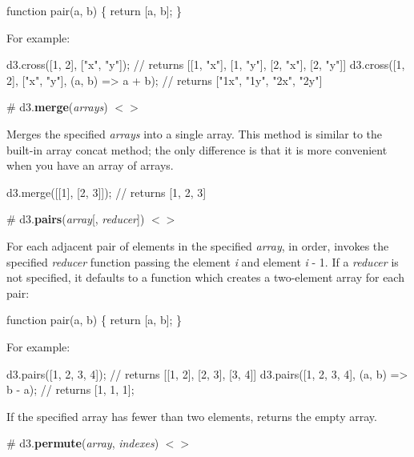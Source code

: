 \begin{DoxyCode}
function pair(a, b) \{
  return [a, b];
\}
\end{DoxyCode}


For example\+:


\begin{DoxyCode}
d3.cross([1, 2], ["x", "y"]); // returns [[1, "x"], [1, "y"], [2, "x"], [2, "y"]]
d3.cross([1, 2], ["x", "y"], (a, b) => a + b); // returns ["1x", "1y", "2x", "2y"]
\end{DoxyCode}


\label{_merge}%
\# d3.{\bfseries merge}({\itshape arrays}) \href{https://github.com/d3/d3-array/blob/master/src/merge.js}{\tt $<$$>$}

Merges the specified {\itshape arrays} into a single array. This method is similar to the built-\/in array concat method; the only difference is that it is more convenient when you have an array of arrays.


\begin{DoxyCode}
d3.merge([[1], [2, 3]]); // returns [1, 2, 3]
\end{DoxyCode}


\label{_pairs}%
\# d3.{\bfseries pairs}({\itshape array}\mbox{[}, {\itshape reducer}\mbox{]}) \href{https://github.com/d3/d3-array/blob/master/src/pairs.js}{\tt $<$$>$}

For each adjacent pair of elements in the specified {\itshape array}, in order, invokes the specified {\itshape reducer} function passing the element {\itshape i} and element {\itshape i} -\/ 1. If a {\itshape reducer} is not specified, it defaults to a function which creates a two-\/element array for each pair\+:


\begin{DoxyCode}
function pair(a, b) \{
  return [a, b];
\}
\end{DoxyCode}


For example\+:


\begin{DoxyCode}
d3.pairs([1, 2, 3, 4]); // returns [[1, 2], [2, 3], [3, 4]]
d3.pairs([1, 2, 3, 4], (a, b) => b - a); // returns [1, 1, 1];
\end{DoxyCode}


If the specified array has fewer than two elements, returns the empty array.

\label{_permute}%
\# d3.{\bfseries permute}({\itshape array}, {\itshape indexes}) \href{https://github.com/d3/d3-array/blob/master/src/permute.js}{\tt $<$$>$}

